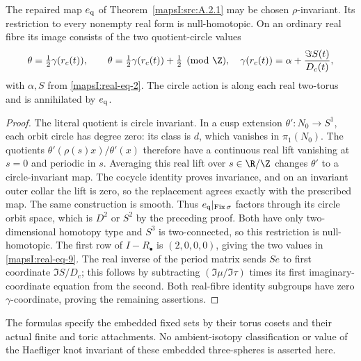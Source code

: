 \begin{proposition}\label{mapsI:src:A.3.4}
The repaired map $e_{\rm q}$ of Theorem~\ref{mapsI:src:A.2.1} may be chosen $\rho$-invariant. Its restriction to
every nonempty real form is null-homotopic. On an ordinary real fibre
its image consists of the two quotient-circle values
\[
 \theta=\tfrac12\gamma(r_c(t)),\qquad
 \theta=\tfrac12\gamma(r_c(t))+\tfrac12\pmod\Z,
 \quad
 \gamma(r_c(t))=\alpha+\frac{\Im S(t)}{D_c(t)},
 \label{mapsI:real-eq-9}
\]
with $\alpha,S$ from \eqref{mapsI:real-eq-2}. The circle action is along each real
two-torus and is annihilated by $e_{\rm q}$.
\end{proposition}

\begin{proof}
The literal quotient is circle invariant. In a cusp extension
$\theta':N_0\to S^1$, each orbit circle has degree zero: its class is
$d$, which vanishes in $\pi_1(N_0)$. The quotients
$\theta'(\rho(s)x)/\theta'(x)$ therefore have a continuous real lift
vanishing at $s=0$ and periodic in $s$. Averaging this real lift over
$s\in\R/\Z$ changes $\theta'$ to a circle-invariant map. The cocycle
identity proves invariance, and on an invariant outer collar the lift
is zero, so the replacement agrees exactly with the prescribed map.
The same construction is smooth. Thus $e_{\rm q}|_{\operatorname{Fix}\sigma}$
factors through its circle orbit space, which is $D^2$ or $S^2$ by the
preceding proof. Both have only two-dimensional homotopy type and
$S^3$ is two-connected, so this restriction is null-homotopic.
The first row of $I-R_\bullet$ is $(2,0,0,0)$, giving the two values
in \eqref{mapsI:real-eq-9}. The real inverse of the period matrix sends $S e$ to
first coordinate $\Im S/D_c$; this follows by subtracting
$(\Im\mu/\Im\tau)$ times its first imaginary-coordinate equation
from the second. Both real-fibre identity subgroups have zero
$\gamma$-coordinate, proving the remaining assertions.
\end{proof}

The formulas specify the embedded fixed sets by their torus cosets and
their actual finite and toric attachments. No ambient-isotopy
classification or value of the Haefliger knot invariant of these
embedded three-spheres is asserted here.

